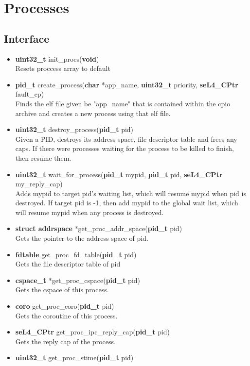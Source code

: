 \documentclass[12pt]{article}
\begin{document}
\clearpage
\section{Processes}
\subsection{Interface}
\begin{itemize}
\item \textbf{uint32\_t} init\_procs(\textbf{void})\\
Resets proccess array to default
\item \textbf{pid\_t} create\_process(\textbf{char} *app\_name, \textbf{uint32\_t} priority, \textbf{seL4\_CPtr} fault\_ep)\\
Finds the elf file given be "app\_name" that is contained within the cpio archive and creates a new process using that elf file.
\item \textbf{uint32\_t} destroy\_process(\textbf{pid\_t} pid)\\
Given a PID, destroys its address space, file descriptor table and frees any caps. If there were processes waiting for the process to be killed to finish, then resume them.
\item \textbf{uint32\_t} wait\_for\_process(\textbf{pid\_t} mypid, \textbf{pid\_t} pid, \textbf{seL4\_CPtr} my\_reply\_cap)\\
Adds mypid to target pid's waiting list, which will resume mypid when pid is destroyed. If target pid is -1, then add mypid to the global wait list, which will resume mypid when any process is destroyed.
\item \textbf{struct addrspace} *get\_proc\_addr\_space(\textbf{pid\_t} pid)\\
Gets the pointer to the address space of pid.
\item \textbf{fdtable} get\_proc\_fd\_table(\textbf{pid\_t} pid)\\
Gets the file descriptor table of pid
\item \textbf{cspace\_t} *get\_proc\_cspace(\textbf{pid\_t} pid)\\
Gets the cspace of this process.
\item \textbf{coro} get\_proc\_coro(\textbf{pid\_t} pid)\\
Gets the coroutine of this process.
\item \textbf{seL4\_CPtr} get\_proc\_ipc\_reply\_cap(\textbf{pid\_t} pid)\\
Gets the reply cap of the process.
\item \textbf{uint32\_t} get\_proc\_stime(\textbf{pid\_t} pid)\\

\end{itemize}
\end{document}
